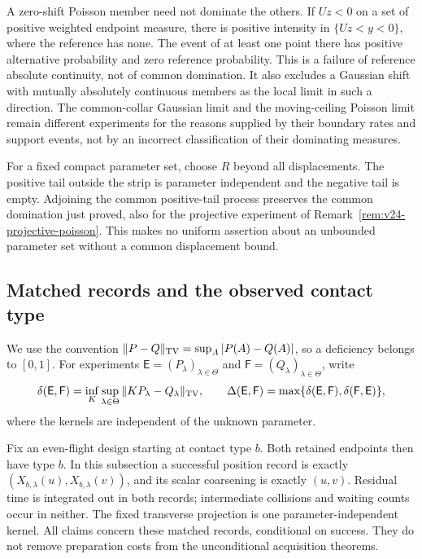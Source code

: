 A zero-shift Poisson member need not dominate the others.  If \(Uz<0\) on
a set of positive weighted endpoint measure, there is positive intensity
in \(\{Uz<y<0\}\), where the reference has none.  The event of at least
one point there has positive alternative probability and zero reference
probability.  This is a failure of reference absolute continuity, not of
common domination.  It also excludes a Gaussian shift with mutually
absolutely continuous members as the local limit in such a direction.
The common-collar Gaussian limit and the moving-ceiling Poisson limit remain
different experiments for the reasons supplied by their boundary rates and
support events, not by an incorrect classification of their dominating
measures.

For a fixed compact parameter set, choose \(R\) beyond all displacements.
The positive tail outside the strip is parameter independent and the negative
tail is empty.  Adjoining the common positive-tail process preserves the
common domination just proved, also for the projective experiment of
Remark~\ref{rem:v24-projective-poisson}.  This makes no uniform assertion
about an unbounded parameter set without a common displacement bound.

\subsection{Matched records and the observed contact type}

We use the convention
\(\|P-Q\|_{\rm TV}=\sup_A|P(A)-Q(A)|\), so a deficiency belongs to
\([0,1]\).  For experiments \(\mathsf E=(P_\lambda)_{\lambda\in\Theta}\)
and \(\mathsf F=(Q_\lambda)_{\lambda\in\Theta}\), write
\[
 \delta(\mathsf E,\mathsf F)=\inf_K\sup_{\lambda\in\Theta}
                   \|KP_\lambda-Q_\lambda\|_{\rm TV},\qquad
 \Delta(\mathsf E,\mathsf F)=
       \max\{\delta(\mathsf E,\mathsf F),\delta(\mathsf F,\mathsf E)\},
\]
where the kernels are independent of the unknown parameter.

Fix an even-flight design starting at contact type \(b\).  Both retained
endpoints then have type \(b\).  In this subsection a successful position
record is exactly \((X_{b,\lambda}(u),X_{b,\lambda}(v))\), and its scalar
coarsening is exactly \((u,v)\).  Residual time is integrated out in both
records; intermediate collisions and waiting counts occur in neither.
The fixed transverse projection is one parameter-independent kernel.  All
claims concern these matched records, conditional on success.  They do not
remove preparation costs from the unconditional acquisition theorems.

